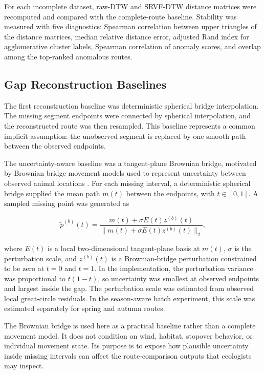 For each incomplete dataset, raw-DTW and SRVF-DTW distance matrices were recomputed and compared with the complete-route baseline. Stability was measured with five diagnostics: Spearman correlation between upper triangles of the distance matrices, median relative distance error, adjusted Rand index for agglomerative cluster labels, Spearman correlation of anomaly scores, and overlap among the top-ranked anomalous routes.

\subsection{Gap Reconstruction Baselines}\label{gap-reconstruction-baselines}

The first reconstruction baseline was deterministic spherical bridge interpolation. The missing segment endpoints were connected by spherical interpolation, and the reconstructed route was then resampled. This baseline represents a common implicit assumption: the unobserved segment is replaced by one smooth path between the observed endpoints.

The uncertainty-aware baseline was a tangent-plane Brownian bridge, motivated by Brownian bridge movement models used to represent uncertainty between observed animal locations \citep{horne2007}. For each missing interval, a deterministic spherical bridge supplied the mean path \(m(t)\) between the endpoints, with \(t\in[0,1]\). A sampled missing point was generated as

\[
\tilde p^{(b)}(t)
= \frac{m(t) + \sigma E(t) z^{(b)}(t)}
{\lVert m(t) + \sigma E(t) z^{(b)}(t)\rVert_2},
\]

where \(E(t)\) is a local two-dimensional tangent-plane basis at \(m(t)\), \(\sigma\) is the perturbation scale, and \(z^{(b)}(t)\) is a Brownian-bridge perturbation constrained to be zero at \(t=0\) and \(t=1\). In the implementation, the perturbation variance was proportional to \(t(1-t)\), so uncertainty was smallest at observed endpoints and largest inside the gap. The perturbation scale was estimated from observed local great-circle residuals. In the season-aware batch experiment, this scale was estimated separately for spring and autumn routes.

The Brownian bridge is used here as a practical baseline rather than a complete movement model. It does not condition on wind, habitat, stopover behavior, or individual movement state. Its purpose is to expose how plausible uncertainty inside missing intervals can affect the route-comparison outputs that ecologists may inspect.

